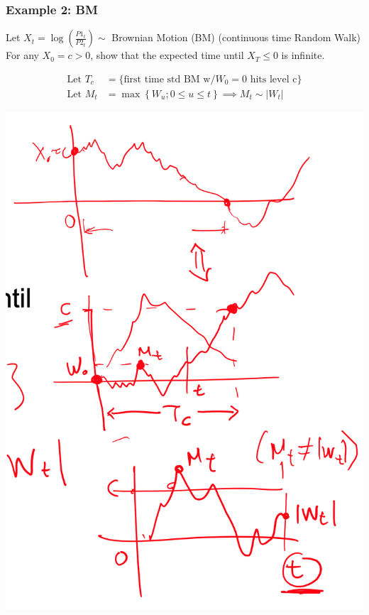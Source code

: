 \documentclass[
  oneside]{book}
\begin{document}
\hypertarget{example-2-bm}{%
\subsubsection{Example 2: BM}\label{example-2-bm}}

Let \(X_{t} = \log(\frac{P1_{t}}{P2_{t}}) \sim\) Brownian Motion (BM) (continuous time Random Walk)
For any \(X_{0}=c > 0\), show that the expected time until \(X_{T}\leq 0\) is infinite.

\[
\begin{aligned}
\text{Let } T_{c} &= \{\text{first time std BM w/} W_{0} =0 \text{ hits level c}\}\\
\text{Let }M_{t} &= \max\left\{ W_{u} ; 0 \leq u \leq t \right\}
\implies M_{t} \sim |W_{t}|
\end{aligned}
\]

\includegraphics{Notes/Obsidian-Attachments/9-Statistical-Arbitrage-14.png}
\end{document}
